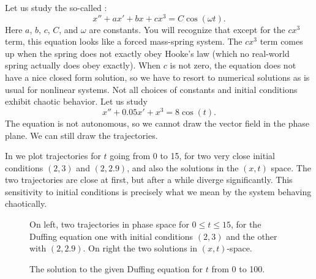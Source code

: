 Let us study the so-called \emph{}:
\begin{equation*}
x'' + a x' + bx + cx^3 = C \cos(\omega t) .
\end{equation*}
Here $a$, $b$, $c$, $C$, and $\omega$ are constants.
You will recognize that except for the $c x^3$ term, this equation looks like
a forced mass-spring system.  The $c x^3$ term comes up when the spring does
not exactly obey Hooke's law (which no real-world spring actually does obey
exactly).  When $c$ is not zero, the equation does not have a nice closed
form solution, so we have to resort to numerical solutions as is usual for
nonlinear systems.  Not all choices of constants and initial conditions
exhibit chaotic behavior.  Let us study
\begin{equation*}
x''+0.05 x' + x^3 = 8\cos(t) .
\end{equation*}
The equation is not autonomous, so we cannot 
draw the vector field in the phase plane.
We can still draw the
trajectories.   

In  we plot trajectories for $t$ going from 0
to 15, for two very close initial conditions
$(2,3)$ and $(2,2.9)$, and also the solutions in the $(x,t)$ space.  The two
trajectories are close at first, but after a while diverge significantly.
This sensitivity to initial conditions is precisely what
we mean by the system behaving chaotically.

\begin{figure}[h!t]
\capstart
\begin{center}
\caption{On left, two trajectories in phase space for $0 \leq t \leq 15$, for the Duffing equation
one with initial conditions $(2,3)$ and the other with $(2,2.9)$.  On
right the two solutions in $(x,t)$-space. \label{nlin:duf-two-traj}}
\end{center}
\end{figure}

\begin{figure}[h!t]
\capstart
\begin{center}
\caption{The solution to the given Duffing equation for $t$ from 0 to 100.
\label{nlin:duf-long}}
\end{center}
\end{figure}

